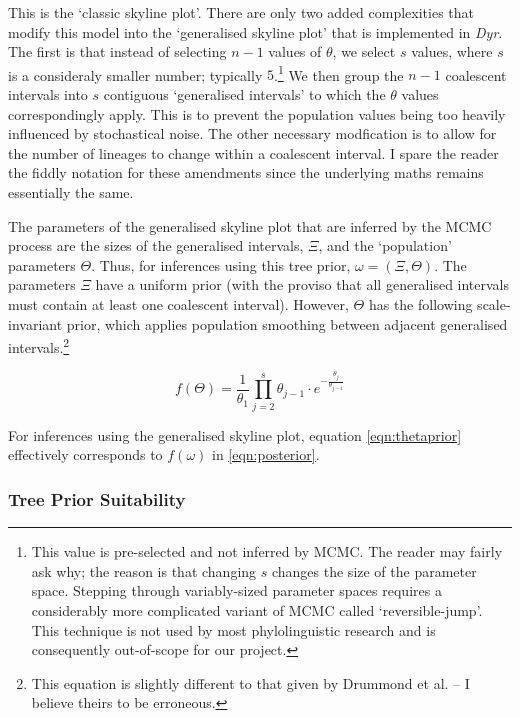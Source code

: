 \documentclass[10pt,journal,compsoc]{IEEEtran}
\begin{document}
This is the `classic skyline plot'. There are only two added complexities that modify this model into the `generalised skyline plot' that is implemented in \textit{Dyr}. The first is that instead of selecting $n - 1$ values of $\theta$, we select $s$ values, where $s$ is a consideraly smaller number; typically $5$.\footnote{This value is pre-selected and not inferred by MCMC. The reader may fairly ask why; the reason is that changing $s$ changes the size of the parameter space. Stepping through variably-sized parameter spaces requires a considerably more complicated variant of MCMC called `reversible-jump'. This technique is not used by most phylolinguistic research and is consequently out-of-scope for our project.} We then group the $n - 1$ coalescent intervals into $s$ contiguous `generalised intervals' to which the $\theta$ values correspondingly apply. This is to prevent the population values being too heavily influenced by stochastical noise. The other necessary modfication is to allow for the number of lineages to change within a coalescent interval. I spare the reader the fiddly notation for these amendments since the underlying maths remains essentially the same.

The parameters of the generalised skyline plot that are inferred by the MCMC process are the sizes of the generalised intervals, $\Xi$, and the `population' parameters $\Theta$. Thus, for inferences using this tree prior, $\omega = (\Xi, \Theta)$. The parameters $\Xi$ have a uniform prior (with the proviso that all generalised intervals must contain at least one coalescent interval). However, $\Theta$ has the following scale-invariant prior, which applies population smoothing between adjacent generalised intervals.\footnote{This equation is slightly different to that given by Drummond et al. -- I believe theirs to be erroneous.}

\begin{equation}\label{eqn:thetaprior}
f(\Theta) = \frac{1}{\theta_1} \prod_{j=2}^s \theta_{j-1} \cdot e^{-\frac{\theta_j}{\theta_{j-1}}}
\end{equation}

For inferences using the generalised skyline plot, equation \eqref{eqn:thetaprior} effectively corresponds to $f(\omega)$ in \eqref{eqn:posterior}.

\subsubsection{Tree Prior Suitability}
\end{document}
